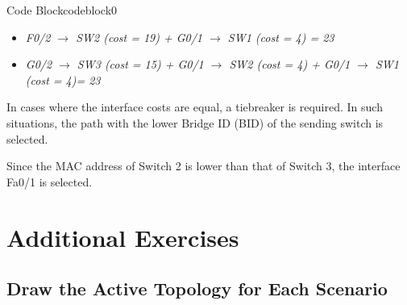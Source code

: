 \documentclass[a4paper]{book}
\begin{document}
\begin{enumerate}
\begin{itemize}
\begin{ocg}{Code Block}{codeblock}{0}
\begin{tcolorbox}
{					            \begin{itemize}
						            \item \textit{F0/2 $\rightarrow$ SW2 (cost = 19) + G0/1 $\rightarrow$ SW1 (cost = 4) = 23}
						            \item \textit{G0/2 $\rightarrow$ SW3 (cost = 15) + G0/1 $\rightarrow$ SW2 (cost = 4) + G0/1 $\rightarrow$ SW1 (cost = 4)= 23}
					            \end{itemize}
					            In cases where the interface costs are equal, a tiebreaker is required. In such situations, the path with the lower Bridge ID (BID) of the sending switch is selected.

					            Since the MAC address of Switch 2 is lower than that of Switch 3, the interface Fa0/1 is selected.
				            }
			            \end{tcolorbox}
		            \end{ocg}

	      \end{itemize}


\end{enumerate}

\newpage
\section*{Additional Exercises}

\subsection*{Draw the Active Topology for Each Scenario}
\end{document}
